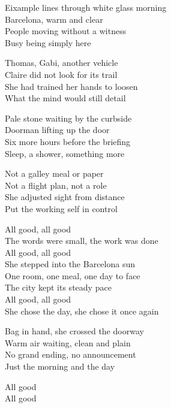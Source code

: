 \begin{lyrics}
Eixample lines through white glass morning\\
Barcelona, warm and clear\\
People moving without a witness\\
Busy being simply here

Thomas, Gabi, another vehicle\\
Claire did not look for its trail\\
She had trained her hands to loosen\\
What the mind would still detail

Pale stone waiting by the curbside\\
Doorman lifting up the door\\
Six more hours before the briefing\\
Sleep, a shower, something more

Not a galley meal or paper\\
Not a flight plan, not a role\\
She adjusted sight from distance\\
Put the working self in control

All good, all good\\
The words were small, the work was done\\
All good, all good\\
She stepped into the Barcelona sun\\
One room, one meal, one day to face\\
The city kept its steady pace\\
All good, all good\\
She chose the day, she chose it once again

Bag in hand, she crossed the doorway\\
Warm air waiting, clean and plain\\
No grand ending, no announcement\\
Just the morning and the day

All good\\
All good
\end{lyrics}

